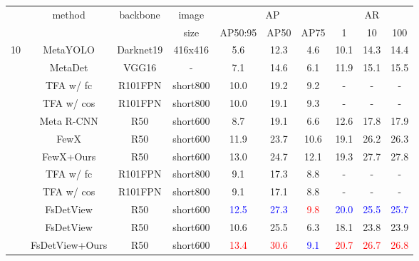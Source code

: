 \documentclass[10pt,twocolumn,letterpaper]{article}
\begin{document}
\begin{table*}
\begin{center}
\begin{tabular}{|c|c|c|c|c|c|c|c|c|c|}
\hline
\rowcolor{white}
\multirow{2}{*}{shots} & \multirow{2}{*}{method} & \multirow{2}{*}{backbone} & image & \multicolumn{3}{c|}{AP} & \multicolumn{3}{c|}{AR} \\ \cline{5-10} 
  &  &  & size & AP50:95 & AP50 & AP75 & 1 & 10 & 100 \\
\hline\hline
\multirow{11}{*}{10}& MetaYOLO \cite{kang2019few}    & Darknet19   & 416x416 & 5.6 & 12.3 & 4.6 & 10.1 & 14.3 & 14.4 \\
& MetaDet \cite{wang2019meta} & VGG16  & - & 7.1 & 14.6 & 6.1 & 11.9 & 15.1 & 15.5 \\
& TFA w/ fc  \cite{wang2020frustratingly}  & R101FPN &short800 & 10.0 & 19.2 & 9.2 & - & - & - \\
& TFA w/ cos  \cite{wang2020frustratingly}  & R101FPN &short800 & 10.0 & 19.1 & 9.3 & - & - & - \\
& Meta R-CNN \cite{yan2019meta} & R50  & short600 & 8.7 & 19.1 & 6.6 & 12.6 & 17.8 & 17.9 \\
& FewX   \cite{fan2020fsod}  & R50 & short600 & 11.9 & 23.7 & 10.6 & 19.1 & 26.2 & 26.3 \\
\rowcolor{Gray}
\cellcolor{white}& FewX+Ours & R50 & short600 & 13.0 & 24.7 & 12.1 & 19.3 & 27.7 & 27.8 \\ \cline{2-10}
&  TFA w/ fc   \cite{wang2020frustratingly} & R101FPN & short800 & 9.1 & 17.3 & 8.8 & - & - & - \\
&  TFA w/ cos   \cite{wang2020frustratingly} & R101FPN & short800 & 9.1 & 17.1 & 8.8 & - & - & - \\
& FsDetView  \cite{xiao2020few}  & R50 & short600 & \textcolor{blue}{12.5} & \textcolor{blue}{27.3} & \textcolor{red}{9.8} & \textcolor{blue}{20.0} & \textcolor{blue}{25.5} & \textcolor{blue}{25.7} \\
& FsDetView     & R50 & short600 & 10.6 & 25.5 & 6.3 & 18.1 & 23.8 & 23.9 \\
\rowcolor{Gray}
\cellcolor{white} & FsDetView+Ours  & R50 & short600 & \textcolor{red}{13.4} & \textcolor{red}{30.6} & \textcolor{blue}{9.1} & \textcolor{red}{20.7} & \textcolor{red}{26.7}  & \textcolor{red}{26.8} \\
\hline \hline


\end{tabular}
\end{center}
\end{table*}
\end{document}
